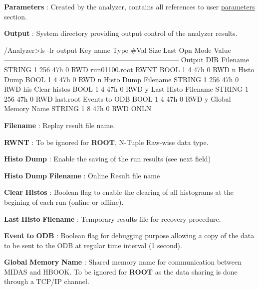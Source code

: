 \begin{DoxyItemize}
\item {\bfseries Parameters} : Created by the analyzer, contains all references to user \hyperlink{structparameters}{parameters} section.
\item {\bfseries Output} : System directory providing output control of the analyzer results. 
\begin{DoxyCode}
/Analyzer>ls -lr output
Key name                        Type    #Val  Size  Last Opn Mode Value
---------------------------------------------------------------------------
Output                          DIR
    Filename                    STRING  1     256   47h  0   RWD  run01100.root
    RWNT                        BOOL    1     4     47h  0   RWD  n
    Histo Dump                  BOOL    1     4     47h  0   RWD  n
    Histo Dump Filename         STRING  1     256   47h  0   RWD  his%
    Clear histos                BOOL    1     4     47h  0   RWD  y
    Last Histo Filename         STRING  1     256   47h  0   RWD  last.root
    Events to ODB               BOOL    1     4     47h  0   RWD  y
    Global Memory Name          STRING  1     8     47h  0   RWD  ONLN
\end{DoxyCode}

\begin{DoxyItemize}
\item {\bfseries Filename} : Replay result file name.
\item {\bfseries RWNT} : To be ignored for {\bfseries ROOT}, N-\/Tuple Raw-\/wise data type.
\item {\bfseries Histo} {\bfseries Dump} : Enable the saving of the run results (see next field)
\item {\bfseries Histo} {\bfseries Dump} {\bfseries Filename} : Online Result file name
\item {\bfseries Clear} {\bfseries Histos} : Boolean flag to enable the clearing of all histograms at the begining of each run (online or offline).
\item {\bfseries Last} {\bfseries Histo} {\bfseries Filename} : Temporary results file for recovery procedure.
\item {\bfseries Event} {\bfseries to} {\bfseries ODB} : Boolean flag for debugging purpose allowing a copy of the data to be sent to the ODB at regular time interval (1 second).
\item {\bfseries Global} {\bfseries Memory} {\bfseries Name} : Shared memory name for communication between MIDAS and HBOOK. To be ignored for {\bfseries ROOT} as the data sharing is done through a TCP/IP channel.
\end{DoxyItemize}
\end{DoxyItemize}


